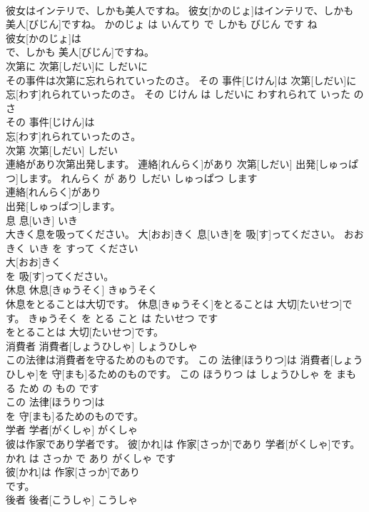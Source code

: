 \documentclass[8pt]{extreport}
\begin{document}
\begin{CJK}{UTF8}{min}
\\	彼女はインテリで、しかも美人ですね。	彼女[かのじょ]はインテリで、しかも 美人[びじん]ですね。	かのじょ は いんてり で しかも びじん です ね	
\\	彼女[かのじょ]は
\\	で、しかも 美人[びじん]ですね。			
\\	次第に	次第[しだい]に	しだいに	
\\	その事件は次第に忘れられていったのさ。	その 事件[じけん]は 次第[しだい]に 忘[わす]れられていったのさ。	その じけん は しだいに わすれられて いった の さ	
\\	その 事件[じけん]は
\\	忘[わす]れられていったのさ。			
\\	次第	次第[しだい]	しだい	
\\	連絡があり次第出発します。	連絡[れんらく]があり 次第[しだい] 出発[しゅっぱつ]します。	れんらく が あり しだい しゅっぱつ します	
\\	連絡[れんらく]があり
\\	出発[しゅっぱつ]します。			
\\	息	息[いき]	いき	
\\	大きく息を吸ってください。	大[おお]きく 息[いき]を 吸[す]ってください。	おおきく いき を すって ください	
\\	大[おお]きく
\\	を 吸[す]ってください。			
\\	休息	休息[きゅうそく]	きゅうそく	
\\	休息をとることは大切です。	休息[きゅうそく]をとることは 大切[たいせつ]です。	きゅうそく を とる こと は たいせつ です	
\\	をとることは 大切[たいせつ]です。			
\\	消費者	消費者[しょうひしゃ]	しょうひしゃ	
\\	この法律は消費者を守るためのものです。	この 法律[ほうりつ]は 消費者[しょうひしゃ]を 守[まも]るためのものです。	この ほうりつ は しょうひしゃ を まもる ため の もの です	
\\	この 法律[ほうりつ]は
\\	を 守[まも]るためのものです。			
\\	学者	学者[がくしゃ]	がくしゃ	
\\	彼は作家であり学者です。	彼[かれ]は 作家[さっか]であり 学者[がくしゃ]です。	かれ は さっか で あり がくしゃ です	
\\	彼[かれ]は 作家[さっか]であり
\\	です。			
\\	後者	後者[こうしゃ]	こうしゃ	

\end{CJK}
\end{document}
